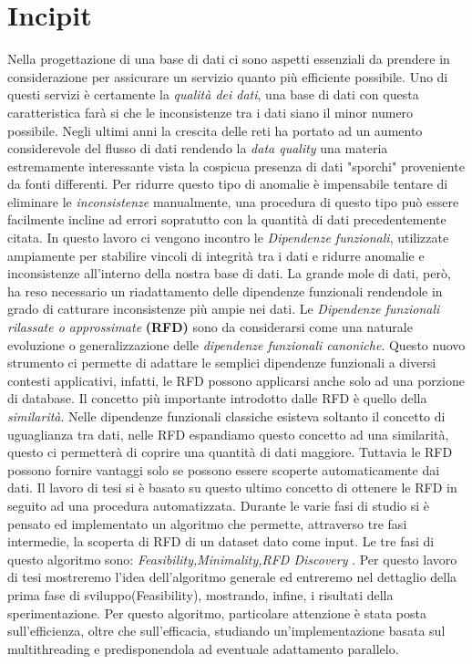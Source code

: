 \section{Incipit}
Nella progettazione di una base di dati ci sono aspetti essenziali da prendere in considerazione per assicurare un servizio quanto più efficiente possibile.
Uno di questi servizi è certamente la \emph{qualità dei dati}, una base di dati con questa caratteristica farà si che le inconsistenze tra i dati siano il minor numero possibile.
Negli ultimi anni la crescita delle reti ha portato ad un aumento considerevole del flusso di dati  rendendo la \emph{data quality} una materia estremamente interessante vista la cospicua presenza di dati "sporchi" proveniente da fonti differenti.
Per ridurre questo tipo di anomalie è impensabile tentare di eliminare le \emph{inconsistenze} manualmente,  una procedura di questo tipo può essere facilmente incline ad errori sopratutto con la quantità di dati precedentemente citata.
In questo lavoro ci vengono incontro le \emph{Dipendenze funzionali}, utilizzate ampiamente per stabilire vincoli di integrità tra i dati e ridurre anomalie e inconsistenze all'interno della nostra base di dati.
La grande mole di dati, però, ha reso necessario un riadattamento delle dipendenze funzionali rendendole in grado di catturare inconsistenze più ampie nei dati. 
Le \emph{Dipendenze funzionali rilassate o approssimate} \textbf{(RFD)} sono da considerarsi come una naturale evoluzione o generalizzazione delle \emph{dipendenze funzionali canoniche}.
Questo nuovo strumento ci permette di adattare le semplici dipendenze funzionali a diversi contesti applicativi, infatti, le RFD possono applicarsi anche solo ad una porzione di database.
Il concetto più importante introdotto dalle RFD è quello della \emph{similarità}.
Nelle dipendenze funzionali classiche esisteva soltanto il concetto di uguaglianza tra dati, nelle RFD espandiamo questo concetto ad una similarità, questo ci permetterà di coprire una quantità di dati maggiore.
Tuttavia le RFD possono fornire vantaggi solo se possono essere scoperte automaticamente dai dati.
Il lavoro di tesi si è basato su questo ultimo concetto di ottenere le RFD in seguito ad una procedura automatizzata.
Durante le varie fasi di studio si è pensato ed implementato un algoritmo che permette, attraverso tre fasi intermedie, la scoperta di RFD di un dataset dato come input.
Le tre fasi di questo algoritmo sono: \emph{Feasibility,Minimality,RFD Discovery} .
Per questo lavoro di tesi mostreremo l'idea dell'algoritmo generale ed entreremo nel dettaglio della prima fase di sviluppo(Feasibility), mostrando, infine, i risultati della sperimentazione.
Per questo algoritmo, particolare attenzione è stata posta sull'efficienza, oltre che sull'efficacia, studiando un'implementazione basata sul multithreading e predisponendola ad eventuale adattamento parallelo.